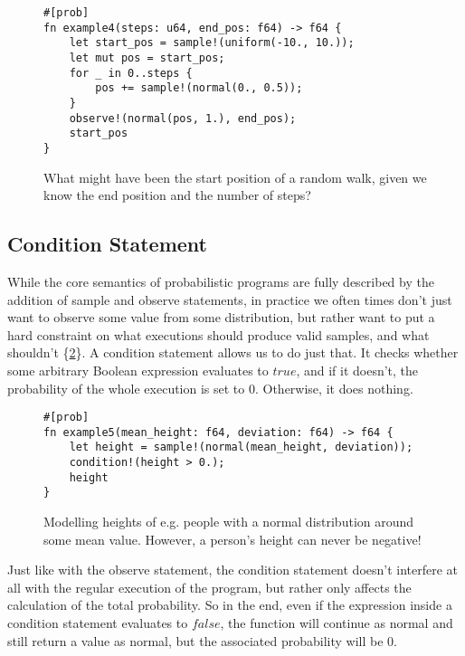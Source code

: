 \begin{figure}[h]
\begin{lstlisting}
#[prob]
fn example4(steps: u64, end_pos: f64) -> f64 {
    let start_pos = sample!(uniform(-10., 10.));
    let mut pos = start_pos;
    for _ in 0..steps {
        pos += sample!(normal(0., 0.5));
    }
    observe!(normal(pos, 1.), end_pos);
    start_pos
}
\end{lstlisting}
\caption{What might have been the start position of a random walk, given we know the end position and the number of steps?}
\label{example4}
\end{figure}


\subsection{Condition Statement}

While the core semantics of probabilistic programs are fully described by the addition of sample and observe statements, in practice we often times don't just want to observe some value from some distribution, but rather want to put a hard constraint on what executions should produce valid samples, and what shouldn't \{\ref{example5}\}. A condition statement allows us to do just that. It checks whether some arbitrary Boolean expression evaluates to $true$, and if it doesn't, the probability of the whole execution is set to $0$. Otherwise, it does nothing.

\begin{figure}[h]
\begin{lstlisting}
#[prob]
fn example5(mean_height: f64, deviation: f64) -> f64 {
    let height = sample!(normal(mean_height, deviation));
    condition!(height > 0.);
    height
}
\end{lstlisting}
\caption{Modelling heights of e.g. people with a normal distribution around some mean value. However, a person's height can never be negative!}
\label{example5}
\end{figure}

Just like with the observe statement, the condition statement doesn't interfere at all with the regular execution of the program, but rather only affects the calculation of the total probability. So in the end, even if the expression inside a condition statement evaluates to $false$, the function will continue as normal and still return a value as normal, but the associated probability will be $0$.

